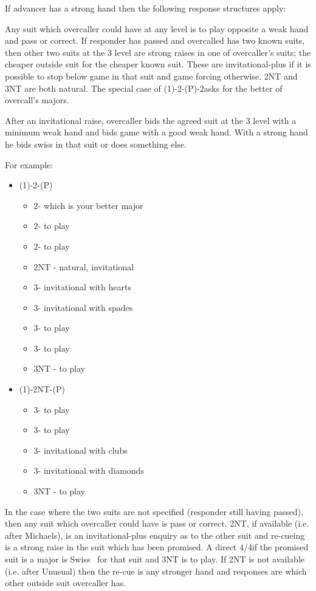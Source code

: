 \documentclass[a4paper,14pt]{extarticle}
\begin{document}
If advancer has a strong hand then the following response structures apply:

Any suit which overcaller could have at any level is to play opposite a weak
hand and pass or correct. If responder has passed and overcalled has two known
suits, then other two suits at the 3 level are strong raises in one of
overcaller's suits; the cheaper outside suit for the cheaper known suit. These
are invitational-plus if it is possible to stop below game in that suit and
game forcing otherwise. 2NT and 3NT are both natural. The special case of
(1\clubs)-2\clubs-(P)-2\diamonds asks for the better of
overcall's majors.

After an invitational raise, overcaller bids the agreed suit at the 3 level
with a minimum weak hand and bids game with a good weak hand. With a strong
hand he bids swiss in that suit or does something else.

For example:

\begin{itemize}
\item (1\clubs)-2\clubs-(P)
	\begin{itemize}
	\item 2\diamonds - which is your better major
	\item 2\hearts - to play
	\item 2\spades - to play
	\item 2NT - natural, invitational
	\item 3\clubs - invitational with hearts
	\item 3\diamonds - invitational with spades
	\item 3\hearts - to play
	\item 3\spades - to play
	\item 3NT - to play
	\end{itemize}
\item (1\hearts)-2NT-(P)
	\begin{itemize}
	\item 3\clubs - to play
	\item 3\diamonds - to play
	\item 3\hearts - invitational with clubs
	\item 3\spades - invitational with diamonds
	\item 3NT - to play
	\end{itemize}
\end{itemize}

In the case where the two suits are not specified (responder still having
		passed), then any suit which overcaller could have is pass or correct.
2NT, if available (i.e. after Michaels), is an invitational-plus enquiry as to
the other suit and re-cueing is a strong raise in the suit which has been
promised. A direct 4\clubs/4\diamonds if the promised suit is a major
is Swiss~ for that suit and 3NT is to play. If 2NT is not
available (i.e. after Unusual) then the re-cue is any stronger hand and
responses are which other outside suit overcaller has.
\end{document}
